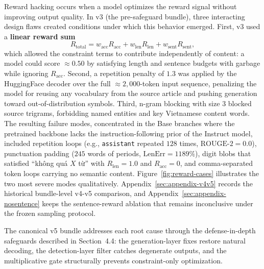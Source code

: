 \documentclass[11pt]{article}
\newcommand{\vn}[1]{{\vietfont #1}}
\begin{document}
Reward hacking occurs when a model optimizes the reward signal without improving output quality.
In v3 (the pre-safeguard bundle), three interacting design flaws created conditions under which this behavior emerged.
First, v3 used a \textbf{linear reward sum}
\[
R_{\text{total}} = w_{\text{acc}}R_{\text{acc}} + w_{\text{len}}R_{\text{len}} + w_{\text{sent}}R_{\text{sent}},
\]
which allowed the constraint terms to contribute independently of content: a model could score $\approx 0.50$ by satisfying length and sentence budgets with garbage while ignoring $R_{\text{acc}}$.
Second, a repetition penalty of $1.3$ was applied by the HuggingFace decoder over the full $\approx 2{,}000$-token input sequence, penalizing the model for reusing any vocabulary from the source article and pushing generation toward out-of-distribution symbols.
Third, n-gram blocking with size $3$ blocked source trigrams, forbidding named entities and key Vietnamese content words.
The resulting failure modes, concentrated in the Base branches where the pretrained backbone lacks the instruction-following prior of the Instruct model, included repetition loops (e.g., \texttt{assistant} repeated $128$ times, $\text{ROUGE-2}=0.0$), punctuation padding ($245$ words of periods, $\text{LenErr}=1189\%$), digit blobs that satisfied ``\vn{không quá $X$ từ}'' with $R_{\text{len}}=1.0$ and $R_{\text{acc}}=0$, and comma-separated token loops carrying no semantic content.
Figure~\ref{fig:reward-cases} illustrates the two most severe modes qualitatively.
Appendix~\ref{sec:appendix-v4v5} records the historical bundle-level v4-v5 comparison, and Appendix~\ref{sec:appendix-nosentence} keeps the sentence-reward ablation that remains inconclusive under the frozen sampling protocol.

The canonical v5 bundle addresses each root cause through the defense-in-depth safeguards described in Section~4.4: the generation-layer fixes restore natural decoding, the detection-layer filter catches degenerate outputs, and the multiplicative gate structurally prevents constraint-only optimization.
\end{document}
